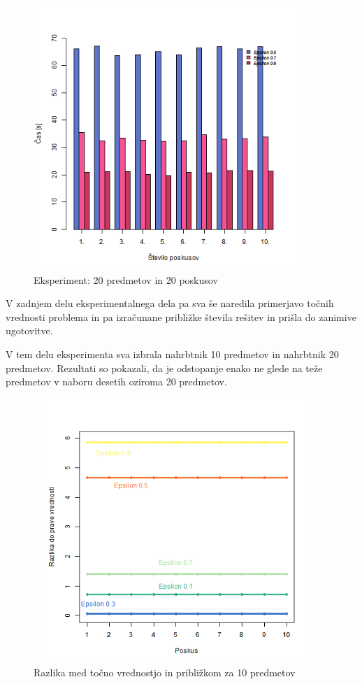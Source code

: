 \documentclass[a4paper,12pt]{article}
\begin{document}
\begin{figure}[H]
\centering
\caption{Eksperiment: 20 predmetov in 20 poskusov}
\includegraphics[width=10 cm, height = 10cm]{20predmetov}
\end{figure}



\newpage

\noindent V zadnjem delu eksperimentalnega dela pa sva še naredila primerjavo točnih vrednosti problema in pa izračunane približke števila rešitev in prišla do zanimive ugotovitve. 
\vspace{3mm}

\noindent V tem delu eksperimenta sva izbrala nahrbtnik 10 predmetov in nahrbtnik 20 predmetov. Rezultati so pokazali, da je odstopanje enako ne glede na teže predmetov v naboru desetih oziroma 20 predmetov. 
\vspace{5mm}

\begin{figure}[H]
\centering
\caption{Razlika med točno vrednostjo in približkom za 10 predmetov}
\includegraphics[width=11cm, height = 10cm]{Odstopanje10}
\end{figure}
\end{document}
